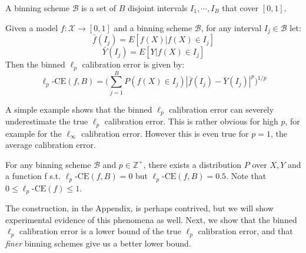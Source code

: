\begin{definition}
A binning scheme $\mathcal{B}$ is a set of $B$ disjoint intervals $I_1, \cdots, I_B$ that cover $[0, 1]$.
\end{definition}

\begin{definition}
Given a model $f : \mathcal{X} \to [0, 1]$ and a binning scheme $\mathcal{B}$, for any interval $I_j \in \mathcal{B}$ let:
\[ \bar{f}(I_j) = E[f(X) | f(X) \in I_j] \]
\[ \bar{Y}(I_j) = E[Y | f(X) \in I_j] \]
Then the binned $\ell_p$ calibration error is given by:
\[ \ell_p\mbox{-CE}(f, B) = \Big( \sum_{j=1}^B P(f(X) \in I_j) \left|\bar{f}(I_j) - \bar{Y}(I_j) \right|^p  \Big)^{1/p} \]
\end{definition}

A simple example shows that the binned $\ell_p$ calibration error can severely underestimate the true $\ell_p$ calibration error. This is rather obvious for high $p$, for example for the $\ell_{\infty}$ calibration error. However this is even true for $p=1$, the average calibration error. 

\begin{example}
\label{ex:continuous-not-calibrated}
For any binning scheme $\mathcal{B}$ and $p \in \mathbb{Z}^+$, there exists a distribution $P$ over $X, Y$ and a function f s.t. $\ell_p\mbox{-CE}(f, B) = 0$ but $\ell_p\mbox{-CE}(f, B) = 0.5$. Note that $0 \leq \ell_p\mbox{-CE}(f) \leq 1$.
\end{example}


The construction, in the Appendix, is perhaps contrived, but we will show experimental evidence of this phenomena as well. Next, we show that the binned $\ell_p$ calibration error is a lower bound of the true $\ell_p$ calibration error, and that \emph{finer} binning schemes give us a better lower bound.

